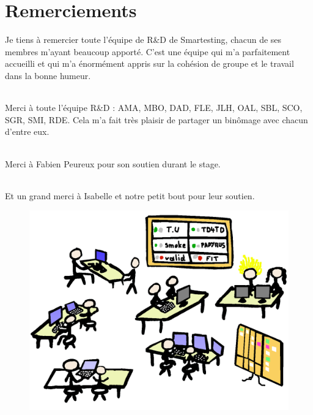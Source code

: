 \chapter*{Remerciements}

Je tiens à remercier toute l'équipe de R\&D de Smartesting, chacun de ses membres m'ayant beaucoup apporté.
C'est une équipe qui m'a parfaitement accueilli et qui m'a énormément appris sur la cohésion de groupe et le travail dans la bonne humeur.

\subparagraph*{}
Merci à toute l'équipe R\&D : AMA, MBO, DAD, FLE, JLH, OAL, SBL, SCO, SGR, SMI, RDE. 
Cela m'a fait très plaisir de partager un binômage avec chacun d'entre eux.
\subparagraph*{}
Merci à Fabien Peureux pour son soutien durant le stage.
\subparagraph*{}
Et un grand merci à Isabelle et notre petit bout pour leur soutien.

\begin{figure}[!b]
\begin{center}
  \includegraphics[scale=.9]{images/remerciementsFinal.png}
\end{center}
\end{figure}

